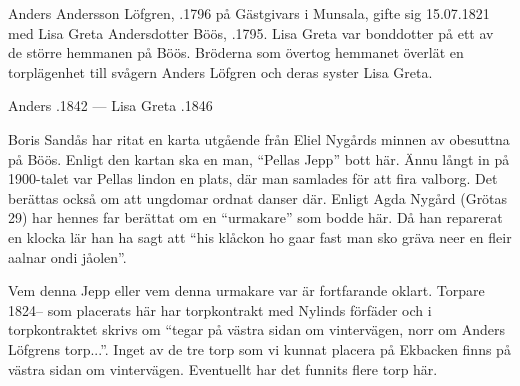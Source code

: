 %
Anders Andersson Löfgren, .1796 på Gästgivars i Munsala, gifte sig 15.07.1821 med Lisa Greta Andersdotter Böös, .1795. Lisa Greta var bonddotter på ett av de större hemmanen på Böös. Bröderna som övertog hemmanet överlät en torplägenhet till svågern Anders Löfgren och deras syster Lisa Greta.
\begin{jhchildren}
  \item {}
  \item {}
  \item {}
  \item {}
  \item {}
  \item {}
\end{jhchildren}
Anders .1842  ---  Lisa Greta .1846



%

Boris Sandås har ritat en karta utgående från Eliel Nygårds minnen av obesuttna på Böös. Enligt den kartan ska en man, ``Pellas Jepp'' bott här. Ännu långt in på 1900-talet var Pellas lindon en plats, där man samlades för att fira valborg. Det berättas också om att ungdomar ordnat danser där. Enligt Agda Nygård (Grötas 29) har hennes far berättat om en ``urmakare'' som bodde här. Då han reparerat en klocka lär han ha sagt att ``his klåckon ho gaar fast man sko gräva neer en fleir aalnar ondi jåolen''.

Vem denna Jepp eller vem denna urmakare var är fortfarande oklart. Torpare 1824-- som placerats här har torpkontrakt med Nylinds förfäder och i torpkontraktet skrivs om ``tegar på västra sidan om 	vintervägen, norr om Anders Löfgrens torp...''. Inget av de tre torp som vi kunnat placera på Ekbacken finns på västra sidan om vintervägen. Eventuellt har det funnits flere torp här.



